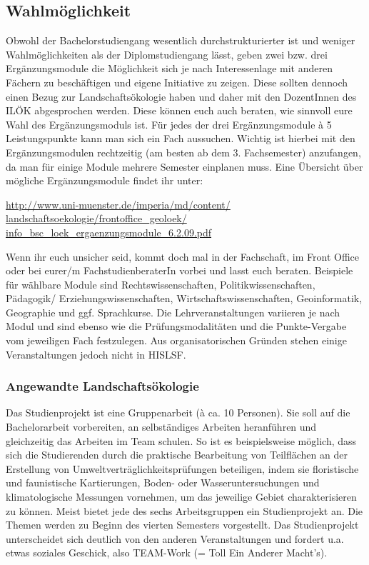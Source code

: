 \subsection*{Wahlmöglichkeit}
Obwohl der Bachelorstudiengang wesentlich durchstrukturierter ist und weniger Wahlmöglichkeiten als der Diplomstudiengang lässt, geben zwei bzw. drei Ergänzungsmodule die Möglichkeit sich je nach Interessenlage mit anderen Fächern zu beschäftigen und eigene Initiative zu zeigen. Diese sollten dennoch einen Bezug zur Landschaftsökologie haben und daher mit den DozentInnen des ILÖK abgesprochen werden. Diese können euch auch beraten, wie sinnvoll eure Wahl des Ergänzungsmoduls ist. Für jedes der drei Ergänzungsmodule à 5 Leistungspunkte kann man sich ein Fach aussuchen. Wichtig ist hierbei mit den Ergänzungsmodulen rechtzeitig (am besten ab dem 3. Fachsemester) anzufangen, da man für einige Module mehrere Semester einplanen muss. Eine Übersicht über mögliche Ergänzungsmodule ﬁndet ihr unter:

\url{http://www.uni-muenster.de/imperia/md/content/}\\\url{landschaftsoekologie/frontoffice_geoloek/}\\\url{info_bsc_loek_ergaenzungsmodule_6.2.09.pdf}

Wenn ihr euch unsicher seid, kommt doch mal in der Fachschaft, im Front Office oder bei eurer/m FachstudienberaterIn vorbei und lasst euch beraten. Beispiele für wählbare Module sind Rechtswissenschaften, Politikwissenschaften, Pädagogik/ Erziehungswissenschaften, Wirtschaftswissenschaften, Geoinformatik, Geographie und ggf. Sprachkurse. Die Lehrveranstaltungen variieren je nach Modul und sind ebenso wie die Prüfungsmodalitäten und die Punkte-Vergabe vom jeweiligen Fach festzulegen. Aus organisatorischen Gründen stehen einige Veranstaltungen jedoch nicht in HISLSF.

\subsubsection*{Angewandte Landschaftsökologie}
Das Studienprojekt ist eine Gruppenarbeit (à ca. 10 Personen). Sie soll auf die Bachelorarbeit vorbereiten, an selbständiges Arbeiten heranführen und gleichzeitig das Arbeiten im Team schulen. So ist es beispielsweise möglich, dass sich die Studierenden durch die praktische Bearbeitung von Teilﬂächen an der Erstellung von Umweltverträglichkeitsprüfungen beteiligen, indem sie ﬂoristische und faunistische Kartierungen, Boden- oder Wasseruntersuchungen und klimatologische Messungen vornehmen, um das jeweilige Gebiet charakterisieren zu können. Meist bietet jede des sechs Arbeitsgruppen ein Studienprojekt an. Die Themen werden zu Beginn des vierten Semesters vorgestellt. Das Studienprojekt unterscheidet sich deutlich von den anderen Veranstaltungen und fordert u.a. etwas soziales Geschick, also TEAM-Work (= Toll Ein Anderer Macht’s).

